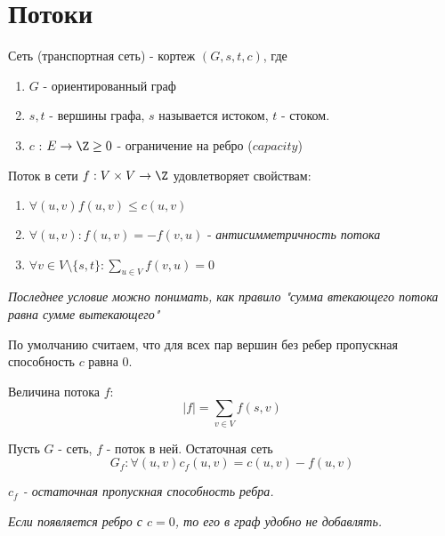 

\section{Потоки}

\begin{definition}
  Сеть (транспортная сеть) - кортеж $(G, s, t, c)$, где 
  \begin{enumerate}
    \item $G$ - ориентированный граф
    \item $s, t$ - вершины графа, $s$ называется истоком, $t$ - стоком.
    \item $c$ : $E \to \Z \ge 0$ - ограничение на ребро ($capacity$) 
  \end{enumerate}
\end{definition}

\begin{definition}
  Поток в сети $f: V \times V \to \Z$ удовлетворяет свойствам:
  \begin{enumerate}
    \item $\forall(u, v) f(u, v) \le c(u, v)$
    \item $\forall (u, v): f(u, v) = -f(v, u)$ - \textit{антисимметричность потока}
    \item $\forall v \in V \setminus \{s, t\}: \sum_{u \in V} f(v, u) = 0$ 
  \end{enumerate} 
\end{definition}

\textit{Последнее условие можно понимать, как правило "сумма втекающего потока равна сумме вытекающего"}

\begin{note}
По умолчанию считаем, что для всех пар вершин без ребер пропускная способность $c$ равна 0.
\end{note}

\begin{definition}
  Величина потока $f$: $$ |f| = \sum_{v \in V} f(s, v)$$
\end{definition}

\begin{definition}
  Пусть $G$ - сеть, $f$ - поток в ней. Остаточная сеть $$G_f: \forall(u, v) c_f(u, v) = c(u, v) - f(u, v)$$
  
  \textit{$c_f$ - остаточная пропускная способность ребра.}

  \textit{Если появляется ребро с $c = 0$, то его в граф удобно не добавлять.}
\end{definition}

